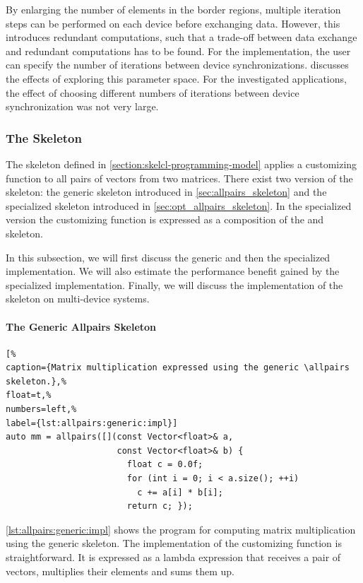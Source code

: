 By enlarging the number of elements in the border regions, multiple iteration steps can be performed on each device before exchanging data.
However, this introduces redundant computations, such that a trade-off between data exchange and redundant computations has to be found.
For the  implementation, the user can specify the number of iterations between device synchronizations.
\cite{Breuer2014} discusses the effects of exploring this parameter space.
For the investigated applications, the effect of choosing different numbers of iterations between device synchronization was not very large.


\subsubsection{The \allpairs Skeleton}
The \allpairs skeleton defined in \autoref{section:skelcl-programming-model} applies a customizing function to all pairs of vectors from two matrices.
There exist two version of the skeleton: the generic \allpairs skeleton introduced in \autoref{sec:allpairs_skeleton} and the specialized \allpairs skeleton introduced in \autoref{sec:opt_allpairs_skeleton}.
In the specialized version the customizing function is expressed as a composition of the \zip and \reduce skeleton.

In this subsection, we will first discuss the generic and then the specialized implementation.
We will also estimate the performance benefit gained by the specialized implementation.
Finally, we will discuss the implementation of the \allpairs skeleton on multi-device systems.

\paragraph{The Generic Allpairs Skeleton}
\begin{lstlisting}[%                                                             
caption={Matrix multiplication expressed using the generic \allpairs skeleton.},%
float=t,%                                                                       
numbers=left,%
label={lst:allpairs:generic:impl}]
auto mm = allpairs([](const Vector<float>& a,
                      const Vector<float>& b) {
                        float c = 0.0f;
                        for (int i = 0; i < a.size(); ++i)
                          c += a[i] * b[i];
                        return c; });
\end{lstlisting}

\autoref{lst:allpairs:generic:impl} shows the \SkelCL program for computing matrix multiplication using the generic \allpairs skeleton.
The implementation of the customizing function is straightforward.
It is expressed as a lambda expression that receives a pair of vectors, multiplies their elements and sums them up.

